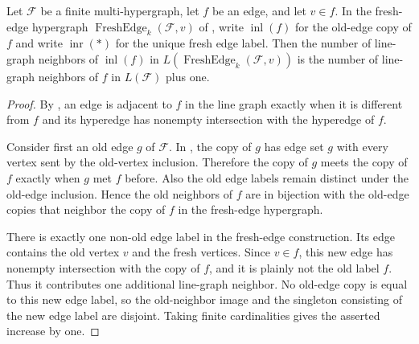 \begin{helper}
Let $\mathcal F$ be a finite multi-hypergraph, let $f$ be an edge, and let
$v\in f$.  In the fresh-edge hypergraph
$\operatorname{FreshEdge}_k(\mathcal F,v)$ of
, write $\operatorname{inl}(f)$ for the
old-edge copy of $f$ and write $\operatorname{inr}(*)$ for the unique fresh
edge label.  Then the number of line-graph neighbors of $\operatorname{inl}(f)$
in $L(\operatorname{FreshEdge}_k(\mathcal F,v))$ is the number of line-graph
neighbors of $f$ in $L(\mathcal F)$ plus one.
\end{helper}
\begin{proof}
By , an edge is adjacent to $f$ in the line
graph exactly when it is different from $f$ and its hyperedge has nonempty
intersection with the hyperedge of $f$.

Consider first an old edge $g$ of $\mathcal F$.  In
, the copy of $g$ has edge set
$g$ with every vertex sent by the old-vertex inclusion.  Therefore the copy
of $g$ meets the copy of $f$ exactly when $g$ met $f$ before.  Also the old
edge labels remain distinct under the old-edge inclusion.  Hence the old
neighbors of $f$ are in bijection with the old-edge copies that neighbor the
copy of $f$ in the fresh-edge hypergraph.

There is exactly one non-old edge label in the fresh-edge construction.  Its
edge contains the old vertex $v$ and the fresh vertices.  Since $v\in f$, this
new edge has nonempty intersection with the copy of $f$, and it is plainly not
the old label $f$.  Thus it contributes one additional line-graph neighbor.
No old-edge copy is equal to this new edge label, so the old-neighbor image
and the singleton consisting of the new edge label are disjoint.  Taking
finite cardinalities gives the asserted increase by one.
\end{proof}
